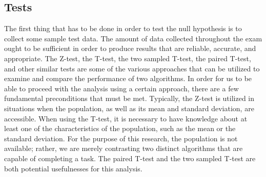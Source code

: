 \subsection{Tests}
The first thing that has to be done in order to test the null hypothesis is to collect 
some sample test data. The amount of data collected throughout the exam ought to 
be sufficient in order to produce results that are reliable, accurate, and appropriate. 
The Z-test, the T-test, the two sampled T-test, the paired T-test, and other similar tests 
are some of the various approaches that can be utilized to examine and compare the performance 
of two algorithms. In order for us to be able to proceed with the analysis using a certain 
approach, there are a few fundamental preconditions that must be met. Typically, 
the Z-test is utilized in situations when the population, as well as its mean and 
standard deviation, are accessible. When using the T-test, it is necessary to have knowledge 
about at least one of the characteristics of the population, such as the mean or the 
standard deviation. For the purpose of this research, the population is not available; 
rather, we are merely contrasting two distinct algorithms that are capable of completing a task. 
The paired T-test and the two sampled T-test are both potential usefulnesses for this analysis.

\newpage